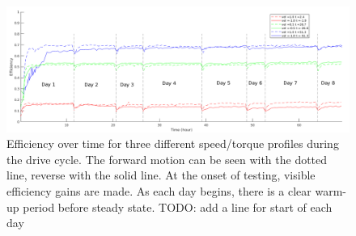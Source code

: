 \begin{figure}[t]
   \centering
   \includegraphics[width=\linewidth]{long_run_plot_v3}
   \caption{Efficiency over time for three different speed/torque profiles during the drive cycle.
   The forward motion can be seen with the dotted line, reverse with the solid line.
   At the onset of testing, visible efficiency gains are made.
   As each day begins, there is a clear warm-up period before steady state.
   TODO: add a line for start of each day}
   \label{long_run}
\end{figure}


